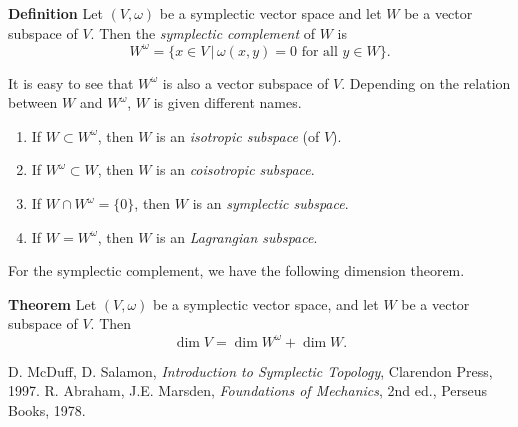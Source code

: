 \documentclass[12pt]{article}
\begin{document}
{\bf Definition} \cite{mcduff, abraham} 
Let $(V,\omega)$ be a  symplectic vector space and let $W$ be a
vector subspace of $V$. Then the \emph{symplectic complement} of $W$
is
$$W^\omega = \{x\in V\, | \, \omega(x,y)=0\,\, \mbox{for all}\,\, y\in W\}.$$

It is easy to see that $W^\omega$  is also a vector subspace of $V$.
Depending on the relation between $W$ and $W^\omega$, 
$W$ is given different names.
\begin{enumerate}
\item If $W\subset W^\omega$, then $W$ is an \emph{isotropic subspace} (of $V$).
\item If $W^\omega \subset W$, then $W$ is an \emph{coisotropic subspace}.
\item If $W \cap W^\omega=\{0\}$, then $W$ is an \emph{symplectic subspace}.
\item If $W = W^\omega$, then $W$ is an \emph{Lagrangian subspace}.
\end{enumerate}

For the symplectic complement, we have the
following dimension theorem.

{\bf Theorem} \cite{mcduff, abraham} Let $(V,\omega)$ be a symplectic vector
space, and let $W$ be a vector subspace of $V$. Then
$$\dim V = \dim W^\omega + \dim W.$$

\begin{thebibliography}{9}
  D. McDuff, D. Salamon,
 \emph{Introduction to Symplectic Topology},
 Clarendon Press, 1997.
 R. Abraham, J.E. Marsden, \emph{Foundations of Mechanics},
2nd ed., Perseus Books, 1978.
 \end{thebibliography}
\end{document}

